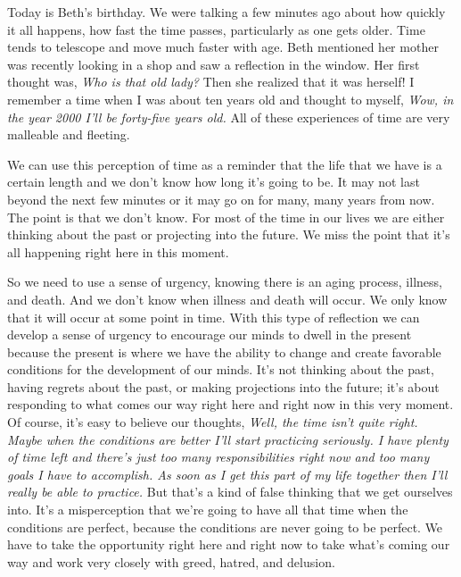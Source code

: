 
Today is Beth's birthday. We were talking a few minutes ago about how 
quickly it all happens, how fast the time passes, particularly as one 
gets older. Time tends to telescope and move much faster with age. Beth 
mentioned her mother was recently looking in a shop and saw a 
reflection in the window. Her first thought was, \emph{Who is that old 
lady?} Then she realized that it was herself! I remember a time when I 
was about ten years old and thought to myself, \emph{Wow, in the year 
2000 I'll be forty-five years old.} All of these experiences of time 
are very malleable and fleeting.

We can use this perception of time as a reminder that the life that we 
have is a certain length and we don't know how long it's going to be. 
It may not last beyond the next few minutes or it may go on for many, 
many years from now. The point is that we don't know. For most of the 
time in our lives we are either thinking about the past or projecting 
into the future. We miss the point that it's all happening right here 
in this moment.

So we need to use a sense of urgency, knowing there is an aging 
process, illness, and death. And we don't know when illness and death 
will occur. We only know that it will occur at some point in time. With 
this type of reflection we can develop a sense of urgency to encourage 
our minds to dwell in the present because the present is where we have 
the ability to change and create favorable conditions for the 
development of our minds. It's not thinking about the past, having 
regrets about the past, or making projections into the future; it's 
about responding to what comes our way right here and right now in this 
very moment. Of course, it's easy to believe our thoughts, \emph{Well, 
the time isn't quite right. Maybe when the conditions are better I'll 
start practicing seriously. I have plenty of time left and there's just 
too many responsibilities right now and too many goals I have to 
accomplish. As soon as I get this part of my life together then I'll 
really be able to practice.} But that's a kind of false thinking that 
we get ourselves into. It's a misperception that we're going to have 
all that time when the conditions are perfect, because the conditions 
are never going to be perfect. We have to take the opportunity right 
here and right now to take what's coming our way and work very closely 
with greed, hatred, and delusion.

